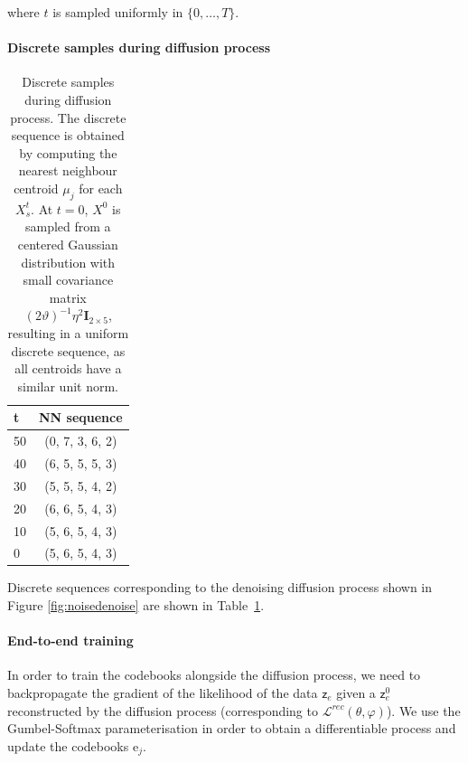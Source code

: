 \documentclass[nohyperref]{article}
\theoremstyle{plain}
\theoremstyle{definition}
\theoremstyle{remark}
\newcommand{\latentcont}{\mathsf{z}_e}
\newcommand{\rme}{\mathrm{e}}
\newcommand{\embed}{\rme}
\begin{document}
where $t$ is sampled uniformly in $\{0,\ldots,T\}$.

\paragraph{Discrete samples during diffusion process}

\begin{table}[h!]
    
    \centering
    \begin{tabular}{l|c}
        t & NN sequence \\
        \hline
        50& (0, 7, 3, 6, 2)\\
        40& (6, 5, 5, 5, 3)\\
        30& (5, 5, 5, 4, 2)\\
        20& (6, 6, 5, 4, 3)\\
        10& (5, 6, 5, 4, 3)\\
        0& (5, 6, 5, 4, 3)
    \end{tabular}
    \caption{\label{ap:tab:discretetoy} Discrete samples during diffusion process. The discrete sequence is obtained by computing the nearest neighbour centroid $\mu_j$ for each $X^t_s$. At $t=0$, $X^0$ is sampled from a centered Gaussian distribution with small covariance matrix $(2\vartheta)^{-1}\eta^2\mathbf{I}_{2\times 5}$, resulting in a uniform discrete sequence, as all centroids have a similar unit norm.}

\end{table}


Discrete sequences corresponding to the denoising diffusion process shown in Figure \ref{fig:noisedenoise} are shown in Table~\ref{ap:tab:discretetoy}.

\paragraph{End-to-end training}
\label{ap:end2end}
In order to train the codebooks alongside the diffusion process, we need to backpropagate the gradient of the likelihood of the data $\latentcont$ given a $\latentcont^0$ reconstructed by the diffusion process (corresponding to $\mathcal{L}^{rec}(\theta,\varphi)$). We use the Gumbel-Softmax parameterisation in order to obtain a differentiable process and update the codebooks $\embed_j$.
\end{document}
